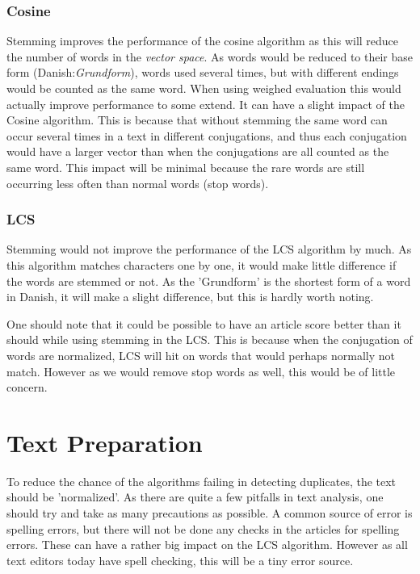 \subsubsection{Cosine}
Stemming improves the performance of the cosine algorithm as this will reduce the number of words in the \textit{vector space}. As words would be reduced to their base form (Danish:\textit{Grundform}), words used several times, but with different endings would be counted as the same word. When using weighed evaluation this would actually improve performance to some extend. It can have a slight impact of the Cosine algorithm. This is because that without stemming the same word can occur several times in a text in different conjugations, and thus each conjugation would have a larger vector than when the conjugations are all counted as the same word. This impact will be minimal because the rare words are still occurring less often than normal words (stop words).

\subsubsection{LCS}
Stemming would not improve the performance of the LCS algorithm by much. As this algorithm matches characters one by one, it would make little difference if the words are stemmed or not. As the 'Grundform' is the shortest form of a word in Danish, it will make a slight difference, but this is hardly worth noting.

One should note that it could be possible to have an article score better than it should while using stemming in the LCS. This is because when the conjugation of words are normalized, LCS will hit on words that would perhaps normally not match. However as we would remove stop words as well, this would be of little concern.

\section{Text Preparation}
\label{TextPrep}
To reduce the chance of the algorithms failing in detecting duplicates, the text should be 'normalized'. As there are quite a few pitfalls in text analysis, one should try and take as many precautions as possible. A common source of error is spelling errors, but there will not be done any checks in the articles for spelling errors. These can have a rather big impact on the LCS algorithm. However as all text editors today have spell checking, this will be a tiny error source.

